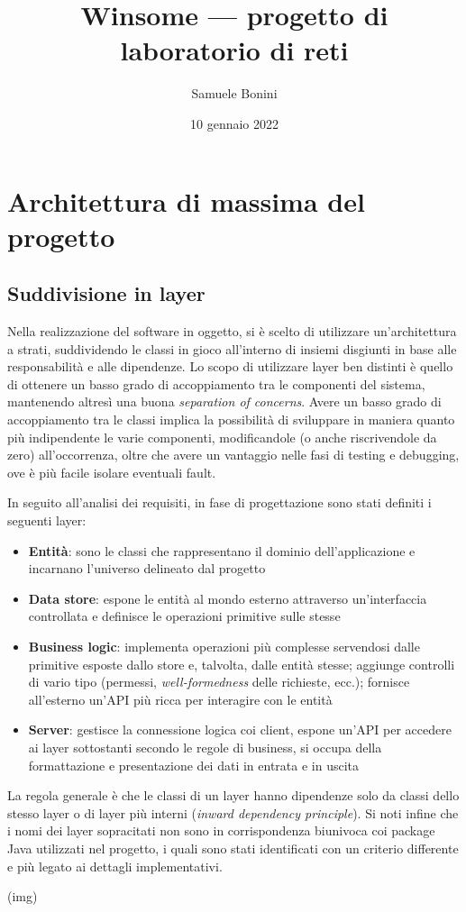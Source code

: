 \documentclass[a4paper,8pt]{article} %
\title{Winsome --- progetto di laboratorio di reti} %
\author{Samuele Bonini}
\date{10 gennaio 2022}
\begin{document}
\maketitle %



\tableofcontents %
\setlength{\parskip}{0.5em}

\section{Architettura di massima del progetto} %
\subsection{Suddivisione in layer}
Nella realizzazione del software in oggetto, si è scelto di utilizzare un'architettura a strati, suddividendo le classi in gioco
all'interno di insiemi disgiunti in base alle responsabilità e alle dipendenze. Lo scopo di utilizzare layer ben distinti è quello
di ottenere un basso grado di accoppiamento tra le componenti del sistema, mantenendo altresì una buona  \emph{separation of concerns}.
Avere un basso grado di accoppiamento tra le classi implica la possibilità di sviluppare in maniera quanto più indipendente
le varie componenti, modificandole (o anche riscrivendole da zero) all'occorrenza, oltre che avere un vantaggio nelle fasi di testing e debugging, ove è
più facile isolare eventuali fault.
\par
In seguito all'analisi dei requisiti, in fase di progettazione sono stati definiti i seguenti layer:
\begin{itemize}
    \item \textbf{Entità}: sono le classi che rappresentano il dominio dell'applicazione e incarnano l'universo delineato dal progetto
    \item \textbf{Data store}: espone le entità al mondo esterno attraverso un'interfaccia controllata e definisce le operazioni primitive sulle stesse
    \item \textbf{Business logic}: implementa operazioni più complesse servendosi dalle primitive esposte dallo store e, talvolta, dalle entità stesse;
          aggiunge controlli di vario tipo (permessi, \emph{well-formedness} delle richieste, ecc.); fornisce all'esterno un'API più ricca per interagire con le entità
    \item \textbf{Server}: gestisce la connessione logica coi client, espone un'API per accedere ai layer sottostanti secondo le regole di business, si occupa della
          formattazione e presentazione dei dati in entrata e in uscita
\end{itemize}
La regola generale è che le classi di un layer hanno dipendenze solo da classi dello stesso layer o di layer più interni (\emph{inward dependency principle}).
Si noti infine che i nomi dei layer sopracitati non sono in corrispondenza biunivoca coi package Java utilizzati nel progetto, i quali sono stati
identificati con un criterio differente e più legato ai dettagli implementativi.
\par(img)
\end{document}
